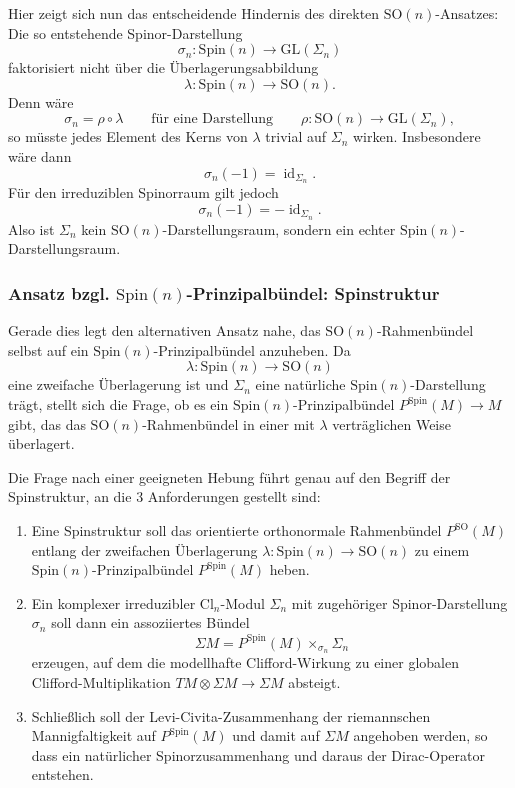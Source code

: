 \documentclass[10pt, letterpaper]{article}
\newcommand{\id}{\operatorname{id}}
\newcommand{\Cl}{\mathrm{Cl}}
\newcommand{\GL}{\mathrm{GL}}
\newcommand{\SO}{\mathrm{SO}}
\newcommand{\Spin}{\mathrm{Spin}}
\begin{document}
Hier zeigt sich nun das entscheidende Hindernis des direkten
\(\SO(n)\)-Ansatzes: Die so entstehende Spinor-Darstellung
\[
\sigma_n:\Spin(n)\to \GL(\Sigma_n)
\]
faktorisiert nicht über die Überlagerungsabbildung
\[
\lambda:\Spin(n)\to \SO(n).
\]
Denn wäre
\[
\sigma_n=\rho\circ \lambda
\qquad\text{für eine Darstellung}\qquad
\rho:\SO(n)\to \GL(\Sigma_n),
\]
so müsste jedes Element des Kerns von \(\lambda\) trivial auf \(\Sigma_n\)
wirken. Insbesondere wäre dann
\[
\sigma_n(-1)=\id_{\Sigma_n}.
\]
Für den irreduziblen Spinorraum gilt jedoch
\[
\sigma_n(-1)=-\id_{\Sigma_n}.
\]
Also ist \(\Sigma_n\) kein \(\SO(n)\)-Darstellungsraum, sondern ein echter
\(\Spin(n)\)-Darstellungsraum.






\subsubsection{Ansatz bzgl. $\Spin(n)$-Prinzipalbündel: Spinstruktur}

Gerade dies legt den alternativen Ansatz nahe, das \(\SO(n)\)-Rahmenbündel
selbst auf ein \(\Spin(n)\)-Prinzipalbündel anzuheben. Da
\[
\lambda:\Spin(n)\to \SO(n)
\]
eine zweifache Überlagerung ist und \(\Sigma_n\) eine natürliche
\(\Spin(n)\)-Darstellung trägt, stellt sich die Frage, ob es ein
\(\Spin(n)\)-Prinzipalbündel \(P^{\Spin}(M)\to M\) gibt, das das
\(\SO(n)\)-Rahmenbündel in einer mit \(\lambda\) verträglichen Weise überlagert.

Die Frage nach einer geeigneten Hebung führt genau auf den Begriff der Spinstruktur, an die 3 Anforderungen gestellt sind:

\begin{enumerate}
\item Eine Spinstruktur soll das orientierte orthonormale Rahmenbündel
      \(P^{\SO}(M)\) entlang der zweifachen Überlagerung
      \(\lambda:\Spin(n)\to\SO(n)\) zu einem \(\Spin(n)\)-Prinzipalbündel
      \(P^{\Spin}(M)\) heben.

\item Ein komplexer irreduzibler \(\Cl_n\)-Modul \(\Sigma_n\) mit zugehöriger
      Spinor-Darstellung \(\sigma_n\) soll dann ein assoziiertes Bündel
      \[
      \Sigma M=P^{\Spin}(M)\times_{\sigma_n}\Sigma_n
      \]
      erzeugen, auf dem die modellhafte Clifford-Wirkung zu einer globalen
      Clifford-Multiplikation \(TM\otimes\Sigma M\to\Sigma M\) absteigt.

\item Schließlich soll der Levi-Civita-Zusammenhang der riemannschen
      Mannigfaltigkeit auf \(P^{\Spin}(M)\) und damit auf \(\Sigma M\)
      angehoben werden, so dass ein natürlicher Spinorzusammenhang und daraus
      der Dirac-Operator entstehen.
\end{enumerate}
\end{document}
